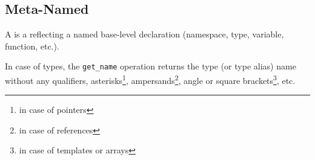 \subsection{Meta-Named}
\label{concept-Meta-Named}

A  is a  reflecting a named base-level declaration
(namespace, type, variable, function, etc.).





In case of types, the \texttt{get\_name} operation returns the type (or type alias)
name without any qualifiers, asterisks\footnote{in case of pointers},
ampersands\footnote{in case of references}, angle or square brackets\footnote{
in case of templates or arrays}, etc.
